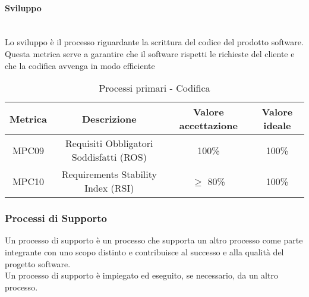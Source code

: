 \documentclass[10pt]{article}
\begin{document}
\begin{justify}
\paragraph{Sviluppo}\mbox{}\\
Lo sviluppo è il processo riguardante la scrittura del codice del prodotto software.\\
Questa metrica serve a garantire che il software rispetti le richieste del cliente e che la codifica avvenga in modo efficiente\\
\begin{table}[H]
  \centering
\begin{tabular}{|c|c|c|c|}
  \hline
  \textbf{Metrica} & \textbf{Descrizione} & \textbf{Valore accettazione} & \textbf{Valore ideale}\\
  \hline
  MPC09 & Requisiti Obbligatori Soddisfatti (ROS) & 100\% & 100\%\\
  \hline
  MPC10 & Requirements Stability Index (RSI) & $\geq$ 80\% & 100\% \\
  \hline
\end{tabular}
\caption{Processi primari - Codifica}
\label{tab:codifica}
\end{table}


\subsubsection{Processi di Supporto}
Un processo di supporto è un processo che supporta un altro processo come parte integrante con uno scopo distinto e contribuisce al successo e alla qualità del progetto software.\\
Un processo di supporto è impiegato ed eseguito, se necessario, da un altro processo.\\

\end{justify}
\end{document}
